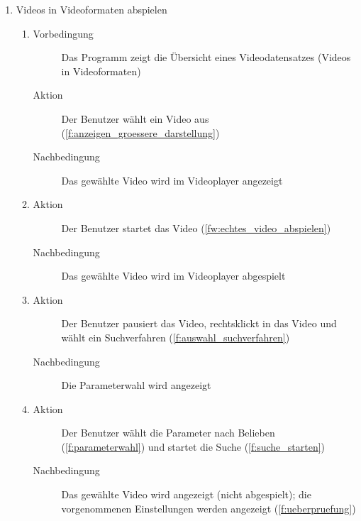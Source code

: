 \begin{enumerate} [label=\bfseries /TSW \arabic*0/, leftmargin=*]
	\item Videos in Videoformaten abspielen \label{ts:echtes_video_abspielen}
	\begin{enumerate}[leftmargin=0pt]
		\item
		\begin{description}
			\item[Vorbedingung] Das Programm zeigt die Übersicht eines Videodatensatzes (Videos in Videoformaten)
			\item[Aktion] Der Benutzer wählt ein Video aus (\ref{f:anzeigen_groessere_darstellung})
			\item[Nachbedingung] Das gewählte Video wird im Videoplayer angezeigt
		\end{description}
		\item
		\begin{description}
			\item[Aktion] Der Benutzer startet das Video (\ref{fw:echtes_video_abspielen})
			\item[Nachbedingung] Das gewählte Video wird im Videoplayer abgespielt
		\end{description}
		\item
		\begin{description}
			\item[Aktion] Der Benutzer pausiert das Video, rechtsklickt in das Video und wählt ein Suchverfahren (\ref{f:auswahl_suchverfahren})
			\item[Nachbedingung] Die Parameterwahl wird angezeigt
		\end{description}
		\item
		\begin{description}
			\item[Aktion] Der Benutzer wählt die Parameter nach Belieben (\ref{f:parameterwahl}) und startet die Suche (\ref{f:suche_starten})
			\item[Nachbedingung] Das gewählte Video wird angezeigt (nicht abgespielt); die vorgenommenen Einstellungen werden angezeigt (\ref{f:ueberpruefung})
		\end{description}
	\end{enumerate}


\end{enumerate}
